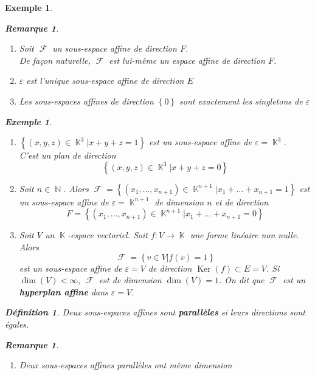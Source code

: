 \documentclass[a4paper, oneside]{report}
\theoremstyle{break}
\newtheorem{definition}[thm]{Définition}
\newtheorem{exemple}[thm]{Exemple}
\newtheorem{remarque}[thm]{Remarque}
\DeclareMathOperator{\N}{\mathbb{N}}
\DeclareMathOperator{\K}{\mathbb{K}}
\DeclareMathOperator{\F}{\mathcal{F}}
\DeclarePairedDelimiter\ens{\left\{ }{\right\} }%
\DeclareMathOperator{\Ker}{Ker}
\renewcommand{\ens}[1]{\left\{ #1 \right\} }%
\newcommand{\slign}{\textbf}
\newcommand{\Ens}{\ens}
\newcommand{\ensF}{\F}
\begin{document}
\begin{exemple}
\begin{remarque}
\begin{enumerate}
\item Soit $\ensF$ un sous-espace affine de direction $F$.\\
De façon naturelle, $\ensF$ est lui-même un espace affine de direction $F$.

\medbreak

\item $\varepsilon$ est l'unique sous-espace affine de direction $E$

\medbreak

\item  Les sous-espaces affines de direction $\ens{0}$ sont exactement les singletons de $\varepsilon$
\end{enumerate}
\end{remarque}

\begin{exemple}
\begin{enumerate}
\item  $\Ens{(x, y, z) \in \K^3 \big| x + y + z = 1}$ est un sous-espace affine de $\varepsilon = \K^3$.\\
C'est un plan de direction
\[
\Ens{(x, y, z) \in \K^3 \big| x + y + z = 0}
\]

\item  Soit $n \in \N$. Alors $\ensF = \Ens{(x_1, \ldots, x_{n+1}) \in \K^{n+1} \big| x_1 + \ldots + x_{n+1} = 1}$ est un sous-espace affine de $\varepsilon = \K^{n+1}$ de dimension $n$ et de direction
\[
F = \Ens{(x_1, \ldots, x_{n+1}) \in \K^{n+1} \big| x_1 + \ldots + x_{n+1} = 0}
\]

\item  Soit $V$ un $\K$-espace vectoriel. Soit $f : V \longrightarrow \K$ une forme linéaire non nulle. Alors
\[
\ensF = \Ens{v \in V \big| f(v) = 1}
\]
est un sous-espace affine de $\varepsilon = V$ de direction $\Ker(f) \subset E = V$. Si $\dim(V) < \infty$, $\ensF$ est de dimension $\dim(V) = 1$. On dit que $\ensF$ est un \slign{hyperplan affine} dans $\varepsilon = V$.

\end{enumerate}
\end{exemple}

\begin{definition}
Deux sous-espaces affines sont \slign{parallèles} si leurs directions sont égales.
\end{definition}

\begin{remarque}
\begin{enumerate}
\item  Deux sous-espaces affines parallèles ont même dimension


\end{enumerate}
\end{remarque}
\end{exemple}
\end{document}
